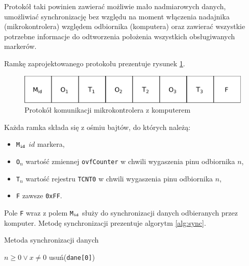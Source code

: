 Protokół taki powinien zawierać możliwie mało nadmiarowych danych, umożliwiać synchronizację bez względu na moment włączenia nadajnika (mikrokontrolera) względem odbiornika (komputera) oraz zawierać wszystkie potrzebne informacje do odtworzenia położenia wszystkich obsługiwanych markerów.

Ramkę zaprojektowanego protokołu prezentuje rysunek \ref{fig:protocol}.

\begin{figure}
 \includegraphics[width=\textwidth]{gfx/diagramy/protokol}
 \caption{Protokół komunikacji mikrokontrolera z komputerem}
 \label{fig:protocol}
\end{figure}

Każda ramka składa się z ośmiu bajtów, do których należą:
\begin{itemize}
 \item \texttt{M$_\textrm{\texttt{id}}$} \ppauza $id$ markera,
 \item \texttt{O$_n$} \ppauza wartość zmiennej \texttt{ovfCounter} w chwili wygaszenia pinu odbiornika $n$,
 \item \texttt{T$_n$} \ppauza wartość rejestru \texttt{TCNT0} w chwili wygaszenia pinu odbiornika $n$,
 \item \texttt{F} \ppauza zawsze \texttt{0xFF}.
\end{itemize}

Pole \texttt{F} wraz z polem \texttt{M$_\textrm{\texttt{id}}$} służy do synchronizacji danych odbieranych przez komputer. Metodę synchronizacji prezentuje algorytm \ref{alg:sync}.

\begin{algorithm}
\caption{Metoda synchronizacji danych}
\label{alg:sync}
\begin{algorithmic}[1]
  \REQUIRE $n \geq 0 \vee x \neq 0$
      \STATE usuń(\texttt{dane[0]})
    \ENDWHILE
  \ENDWHILE
\end{algorithmic}
\end{algorithm}